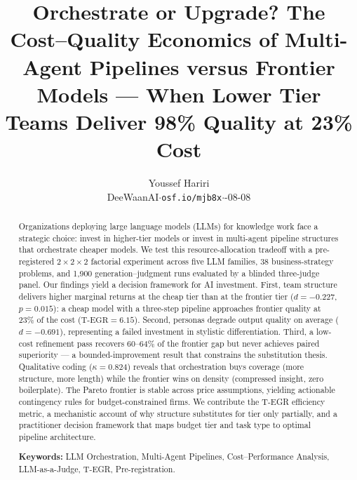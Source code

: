 \documentclass[12pt,a4paper]{article}
\title{\textbf{Orchestrate or Upgrade? The Cost--Quality Economics of
Multi-Agent Pipelines versus Frontier Models --- When Lower Tier Teams
Deliver 98\% Quality at 23\% Cost}}
\author{Youssef Hariri\\
\small DeeWaanAI\quad $\cdot$\quad \texttt{osf.io/mjb8x}\quad $\cdot$\quad 2026-08-08}
\date{}
\newcommand{\TEGR}{\ensuremath{\text{T-EGR}}}
\begin{document}
\maketitle

\begin{abstract}
\noindent
Organizations deploying large language models (LLMs) for knowledge work face a
strategic choice: invest in higher-tier models or invest in multi-agent pipeline
structures that orchestrate cheaper models. We test this resource-allocation
tradeoff with a pre-registered $2 \times 2 \times 2$ factorial experiment across
five LLM families, 38 business-strategy problems, and 1{,}900
generation--judgment runs evaluated by a blinded three-judge panel. Our findings
yield a decision framework for AI investment. First, team structure delivers
higher marginal returns at the cheap tier than at the frontier tier
($d = -0.227$, $p = 0.015$): a cheap model with a three-step pipeline
approaches frontier quality at 23\% of the cost ($\TEGR = 6.15$). Second,
personas degrade output quality on average ($d = -0.691$), representing a
failed investment in stylistic differentiation. Third, a low-cost refinement
pass recovers 60--64\% of the frontier gap but never achieves paired
superiority --- a bounded-improvement result that constrains the substitution
thesis. Qualitative coding ($\kappa = 0.824$) reveals that orchestration buys
coverage (more structure, more length) while the frontier wins on density
(compressed insight, zero boilerplate). The Pareto frontier is stable across
price assumptions, yielding actionable contingency rules for budget-constrained
firms. We contribute the T-EGR efficiency metric, a mechanistic account of why
structure substitutes for tier only partially, and a practitioner decision
framework that maps budget tier and task type to optimal pipeline architecture.

\medskip
\noindent\textbf{Keywords:} LLM Orchestration, Multi-Agent Pipelines,
Cost--Performance Analysis, LLM-as-a-Judge, T-EGR, Pre-registration.
\end{abstract}

\bigskip
\end{document}
